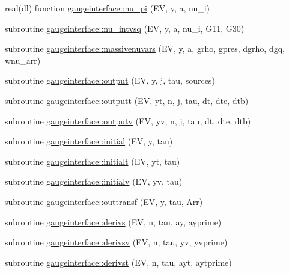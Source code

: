\begin{DoxyCompactItemize}
\item 
real(dl) function \mbox{\hyperlink{namespacegaugeinterface_a33373e2888fd46e2c443d7e8c2785639}{gaugeinterface\+::nu\+\_\+pi}} (EV, y, a, nu\+\_\+i)
\item 
subroutine \mbox{\hyperlink{namespacegaugeinterface_a2e8822823d298cb0912b5ec22ea4a6ff}{gaugeinterface\+::nu\+\_\+intvsq}} (EV, y, a, nu\+\_\+i, G11, G30)
\item 
subroutine \mbox{\hyperlink{namespacegaugeinterface_ae4228ed9cfb9382025eb84617b0ed091}{gaugeinterface\+::massivenuvars}} (EV, y, a, grho, gpres, dgrho, dgq, wnu\+\_\+arr)
\item 
subroutine \mbox{\hyperlink{namespacegaugeinterface_ac370c67bc9750bf5749a69531fe3ffc1}{gaugeinterface\+::output}} (EV, y, j, tau, sources)
\item 
subroutine \mbox{\hyperlink{namespacegaugeinterface_a5235d59ec77fa4b3a41d9754c8e447ca}{gaugeinterface\+::outputt}} (EV, yt, n, j, tau, dt, dte, dtb)
\item 
subroutine \mbox{\hyperlink{namespacegaugeinterface_ad9126befa5df67da981345f6230fede4}{gaugeinterface\+::outputv}} (EV, yv, n, j, tau, dt, dte, dtb)
\item 
subroutine \mbox{\hyperlink{namespacegaugeinterface_aa05aaad2bec1907778ea8eae3a7ba521}{gaugeinterface\+::initial}} (EV, y, tau)
\item 
subroutine \mbox{\hyperlink{namespacegaugeinterface_afbc0a211756e4b923725483b6c961e75}{gaugeinterface\+::initialt}} (EV, yt, tau)
\item 
subroutine \mbox{\hyperlink{namespacegaugeinterface_aeed464df3ecab21d57bcb789fe3b1a22}{gaugeinterface\+::initialv}} (EV, yv, tau)
\item 
subroutine \mbox{\hyperlink{namespacegaugeinterface_ae920635485c908177072c6cad0d49f59}{gaugeinterface\+::outtransf}} (EV, y, tau, Arr)
\item 
subroutine \mbox{\hyperlink{namespacegaugeinterface_a1d317261c83f3b5e84fe401ac2436d44}{gaugeinterface\+::derivs}} (EV, n, tau, ay, ayprime)
\item 
subroutine \mbox{\hyperlink{namespacegaugeinterface_a25ee0c9e055aabce6b7eb205e65f9804}{gaugeinterface\+::derivsv}} (EV, n, tau, yv, yvprime)
\item 
subroutine \mbox{\hyperlink{namespacegaugeinterface_ab2ff4cd74364457862a7ff44fb2ca978}{gaugeinterface\+::derivst}} (EV, n, tau, ayt, aytprime)
\end{DoxyCompactItemize}
